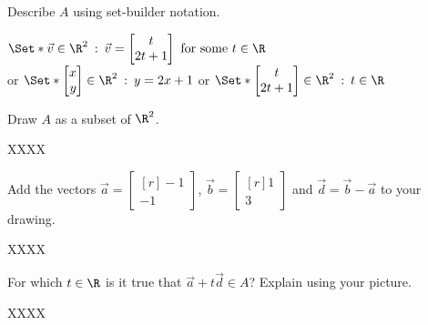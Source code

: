 \documentclass{problemset}
\newcommand{\mat}[1]{\begin{bmatrix*}[r]#1\end{bmatrix*}}
\newcommand{\matc}[1]{\begin{bmatrix}#1\end{bmatrix}}
\providecommand\given{}
\newcommand\SetSymbol[1][]{%
	\nonscript\::%
	\allowbreak
	\nonscript\:
	\mathopen{}}
\renewcommand\given{\SetSymbol[\delimsize]}
\begin{document}
	\begin{parts}
		\item Describe $A$ using set-builder notation.
			\begin{solution}
				$\Set*{\vec v\in\R^2 \given \vec v=\matc{t\\2t+1}\text{ for some } t\in\R}$\\
				or
				$\Set*{\mat{x\\y}\in\R^2 \given y=2x+1}$
				or
				$\Set*{\matc{t\\2t+1}\in\R^2 \given t\in\R}$
			\end{solution}
		\item Draw $A$ as a subset of $\R^2$.
			\begin{solution}
				XXXX
			\end{solution}
		\item Add the vectors $\vec a=\mat{-1\\-1}$, $\vec b=\mat{1\\3}$ and
			$\vec d=\vec b-\vec a$ to your drawing.
			\begin{solution}
				XXXX
			\end{solution}
		\item For which $t\in\R$ is it true that $\vec a+t\vec d\in A$? Explain using your picture.
			\begin{solution}
				XXXX
			\end{solution}
	\end{parts}
\end{document}
